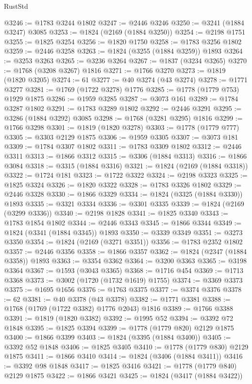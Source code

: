 \begin{lexlean}{RustStd}
\begin{coremodule}
@3246 := @1783 @3244 @1802
@3247 := @2446 @3246
@3250 := @3241 (@1884 @3247) @3085
@3253 := @1824 (@2169 (@1884 @3250))
@3254 := @2198 @1751
@3255 := @1825 @3254
@3256 := @1820 @1750
@3258 := @1783 @3256 @1802
@3259 := @2446 @3258
@3263 := @1824 (@3255 (@1884 @3259)) @1893
@3264 := @3253 @3263
@3265 := @3236 @3264
@3267 := @1837 (@3234 @3265)
@3270 := @1768 (@3208 @3267) @1816
@3271 := @1766 @3270
@3273 := @1819 (@1820 @3205)
@3274 := 61
@3277 := @40 @3274 (@43 @3274)
@3278 := @1771 @3277
@3281 := @1769 (@1722 @3278) @1776
@3285 := @1778 (@1779 @753) @1929 @1875
@3286 := @1959 @3285
@3287 := @3073 @161
@3289 := @1784 @3287 @1802
@3291 := @1783 @3289 @1802
@3292 := @2446 @3291
@3295 := @3286 (@1884 @3292) @3085
@3298 := @1768 (@3281 @3295) @1816
@3299 := @1766 @3298
@3301 := @1819 (@1820 @3278)
@3303 := @1778 (@1779 @777)
@3305 := @3303 @2129 @1875
@3306 := @1959 @3305
@3307 := @3073 @181
@3309 := @1784 @3307 @1802
@3311 := @1783 @3309 @1802
@3312 := @2446 @3311
@3313 := @1866 @3312
@3315 := @3306 (@1884 @3313)
@3316 := @1866 @3084
@3318 := @3315 (@1884 @3316)
@3321 := @1824 (@2169 (@1884 @3318))
@3322 := @1724 @181
@3323 := @1722 @3322
@3324 := @2198 @3323
@3325 := @1825 @3324
@3326 := @1820 @3322
@3328 := @1783 @3326 @1802
@3329 := @2446 @3328
@3330 := @1866 @3329
@3334 := @1824 (@3325 (@1884 @3330)) @1893
@3335 := @3321 @3334
@3336 := @3301 @3335
@3339 := @1824 (@2169 (@3299 @3336))
@3340 := @2198 @1828
@3341 := @1825 @3340
@3343 := @1783 @1854 @1802
@3344 := @2446 @3343
@3345 := @1866 @3344
@3349 := @1824 (@3341 (@1884 @3345)) @1893
@3350 := @3339 @3349
@3351 := @3273 @3350
@3354 := @1824 (@2169 (@3271 @3351))
@3356 := @1783 @2352 @1802
@3357 := @2446 @3356
@3358 := @1866 @3357
@3362 := @1824 (@2347 (@1884 @3358)) @1893
@3363 := @3354 @3362
@3364 := @3200 @3363
@3365 := @3198 @3364
@3367 := @1593 (@3043 @3365)
@3368 := @1716 @454
@3369 := @1713 @3368
@3373 := @3002 (@1720 (@1732 @1619) @1755)
@3374 := @3369 @3373
@3375 := @1695 @1656
@3376 := @1763 @3375
@3377 := @3374 @3376
@3378 := 62
@3381 := @40 @3378 (@43 @3378)
@3382 := @1771 @3381
@3388 := @1768 (@1769 (@1722 @3382) @1776 @2043) @1816
@3389 := @1766 @3388
@3391 := @1819 (@1820 @3382)
@3392 := @1995 @52
@3394 := @3392 @72 @1848
@3395 := @1825 @3394
@3399 := @1778 (@1779 @820) @2129 @1875
@3400 := @1866 @3399
@3403 := @1824 (@3395 (@1884 @3400))
@3405 := @3392 @52 @1848
@3406 := @1825 @3405
@3410 := @1778 (@1779 @830) @2129 @1875
@3411 := @1866 @3410
@3414 := @1824 (@3406 (@1884 @3411))
@3416 := @3392 @98 @1848
@3417 := @1825 @3416
@3421 := @1778 (@1779 @840) @2129 @1875
@3422 := @1866 @3421
@3425 := @1824 (@3417 (@1884 @3422))

\end{coremodule}
\end{lexlean}
